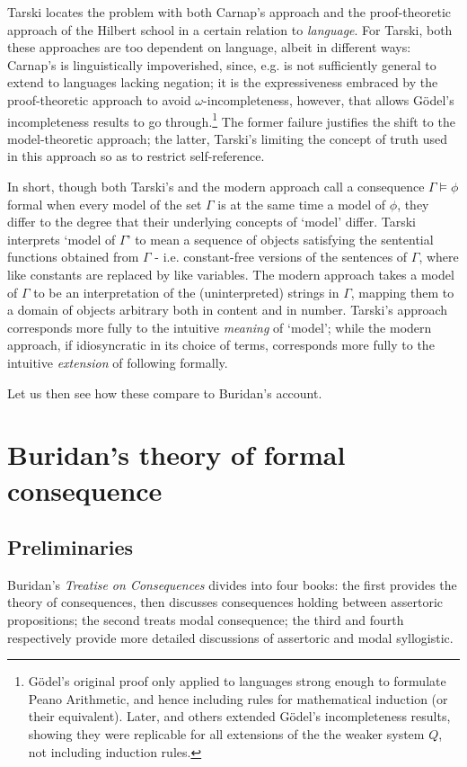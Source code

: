 \documentclass[]{article}
\begin{document}
Tarski locates the problem with both Carnap's approach and the proof-theoretic approach of the Hilbert school in a certain relation to \textit{language}. For Tarski, both these approaches are too dependent on language, albeit in different ways: Carnap's is linguistically impoverished, since, e.g. is not sufficiently general to extend to languages lacking negation; it is the expressiveness embraced by the proof-theoretic approach to avoid $\omega$-incompleteness, however, that allows G\"{o}del's incompleteness results to go through.\footnote{G\"{o}del's original proof only applied to languages strong enough to formulate Peano Arithmetic, and hence including rules for mathematical induction (or their equivalent). Later, \cite{Rosser1936} and others extended G\"{o}del's incompleteness results, showing they were replicable for all extensions of the the weaker system $Q$, not including induction rules.} The former failure justifies the shift to the model-theoretic approach; the latter, Tarski's limiting the concept of truth used in this approach so as to restrict self-reference.

In short, though both Tarski's and the modern approach call a consequence $\Gamma \models \phi$ formal when every model of the set $\Gamma$ is at the same time a model of $\phi$, they differ to the degree that their underlying concepts of `model' differ. Tarski interprets `model of $\Gamma$' to mean a sequence of objects satisfying the sentential functions obtained from $\Gamma$ - i.e. constant-free versions of the sentences of $\Gamma$, where like constants are replaced by like variables. The modern approach takes a model of $\Gamma$ to be an interpretation of the (uninterpreted) strings in $\Gamma$, mapping them to a domain of objects arbitrary both in content and in number. Tarski's approach corresponds more fully to the intuitive \textit{meaning} of `model'; while the modern approach, if idiosyncratic in its choice of terms, corresponds more fully to the intuitive \textit{extension} of following formally. 

Let us then see how these compare to Buridan's account.
\section{Buridan's theory of formal consequence}
\subsection{Preliminaries}
Buridan's \textit{Treatise on Consequences} divides into four books: the first provides the theory of consequences, then discusses consequences holding between assertoric propositions; the second treats modal consequence; the third and fourth respectively provide more detailed discussions of assertoric and modal syllogistic. 
\end{document}
